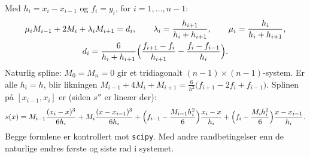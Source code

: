\begin{formel}[Kubisk interpolasjon med momentene $M_i=s''(x_i)$]
Med $h_i=x_i-x_{i-1}$ og $f_i=y_i$, for $i=1,\dots,n-1$:
\begin{gather*}
\mu_iM_{i-1}+2M_i+\lambda_iM_{i+1}=d_i,\qquad \lambda_i=\frac{h_{i+1}}{h_i+h_{i+1}},\qquad \mu_i=\frac{h_i}{h_i+h_{i+1}},\\
d_i=\frac{6}{h_i+h_{i+1}}\Bigl(\frac{f_{i+1}-f_i}{h_{i+1}}-\frac{f_i-f_{i-1}}{h_i}\Bigr).
\end{gather*}
Naturlig spline: $M_0=M_n=0$ gir et tridiagonalt $(n-1)\times(n-1)$-system. Er alle $h_i=h$, blir likningen $M_{i-1}+4M_i+M_{i+1}=\frac6{h^2}\bigl(f_{i+1}-2f_i+f_{i-1}\bigr)$.
Splinen på $[x_{i-1},x_i]$ er (siden $s''$ er lineær der):
\[
s(x)=M_{i-1}\frac{(x_i-x)^3}{6h_i}+M_i\frac{(x-x_{i-1})^3}{6h_i}+\Bigl(f_{i-1}-\frac{M_{i-1}h_i^2}6\Bigr)\frac{x_i-x}{h_i}+\Bigl(f_i-\frac{M_ih_i^2}6\Bigr)\frac{x-x_{i-1}}{h_i}.
\]
Begge formlene er kontrollert mot \texttt{scipy}. Med andre randbetingelser enn de naturlige endres første og siste rad i systemet.
\end{formel}

